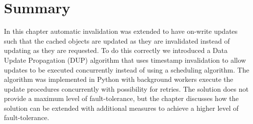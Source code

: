 
\section{Summary}
\label{sec:summary}

In this chapter automatic invalidation was extended to have on-write updates such that the cached objects are updated as they are invalidated instead of updating as they are requested. To do this correctly we introduced a Data Update Propagation (DUP) algorithm that uses timestamp invalidation to allow updates to be executed concurrently instead of using a scheduling algorithm. The algorithm was implemented in Python with background workers execute the update procedures concurrently with possibility for retries. The solution does not provide a maximum level of fault-tolerance, but the chapter discusses how the solution can be extended with additional measures to achieve a higher level of fault-tolerance.


